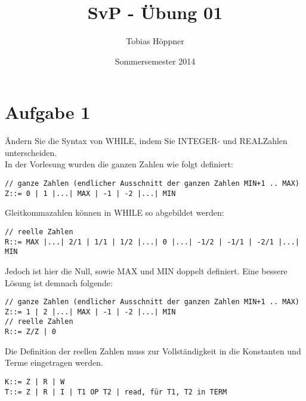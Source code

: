 \documentclass[ngerman,a4paper]{report}
\author{Tobias Höppner}
\title{SvP - Übung 01}
\date{Sommersemester 2014}
\renewcommand{\maketitle}{}
\begin{document}
 
\maketitle 
\section*{Aufgabe 1}
Ändern Sie die Syntax von WHILE, indem Sie INTEGER- und REALZahlen unterscheiden.\\
In der Vorlesung wurden die ganzen Zahlen wie folgt definiert:
\begin{lstlisting}
// ganze Zahlen (endlicher Ausschnitt der ganzen Zahlen MIN+1 .. MAX)
Z::= 0 | 1 |...| MAX | -1 | -2 |...| MIN 
\end{lstlisting}
Gleitkommazahlen können in WHILE so abgebildet werden:
\begin{lstlisting}
// reelle Zahlen
R::= MAX |...| 2/1 | 1/1 | 1/2 |...| 0 |...| -1/2 | -1/1 | -2/1 |...| MIN 
\end{lstlisting}
Jedoch ist hier die Null, sowie MAX und MIN doppelt definiert. Eine bessere Lösung ist demnach folgende:
\begin{lstlisting}
// ganze Zahlen (endlicher Ausschnitt der ganzen Zahlen MIN+1 .. MAX)
Z::= 1 | 2 |...| MAX | -1 | -2 |...| MIN 
// reelle Zahlen
R::= Z/Z | 0 
\end{lstlisting}
Die Definition der reellen Zahlen muss zur Vollständigkeit in die Konstanten und Terme eingetragen werden.
\begin{lstlisting}
K::= Z | R | W
T::= Z | R | I | T1 OP T2 | read, für T1, T2 in TERM
\end{lstlisting}
\end{document}
